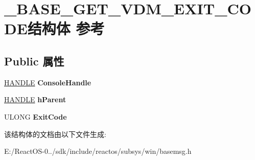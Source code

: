 \hypertarget{struct___b_a_s_e___g_e_t___v_d_m___e_x_i_t___c_o_d_e}{}\section{\+\_\+\+B\+A\+S\+E\+\_\+\+G\+E\+T\+\_\+\+V\+D\+M\+\_\+\+E\+X\+I\+T\+\_\+\+C\+O\+D\+E结构体 参考}
\label{struct___b_a_s_e___g_e_t___v_d_m___e_x_i_t___c_o_d_e}
\subsection*{Public 属性}
\begin{DoxyCompactItemize}
\item 
\mbox{\label{struct___b_a_s_e___g_e_t___v_d_m___e_x_i_t___c_o_d_e_a728269a1b1643a83893f0eb2469a97b8}} 
\hyperlink{interfacevoid}{H\+A\+N\+D\+LE} {\bfseries Console\+Handle}
\item 
\mbox{\label{struct___b_a_s_e___g_e_t___v_d_m___e_x_i_t___c_o_d_e_aaad941e74eb6cbbce6afd8188ebc7b37}} 
\hyperlink{interfacevoid}{H\+A\+N\+D\+LE} {\bfseries h\+Parent}
\item 
\mbox{\label{struct___b_a_s_e___g_e_t___v_d_m___e_x_i_t___c_o_d_e_ab2388656e98514ba7679d52f4e9acb10}} 
U\+L\+O\+NG {\bfseries Exit\+Code}
\end{DoxyCompactItemize}


该结构体的文档由以下文件生成\+:\begin{DoxyCompactItemize}
\item 
E\+:/\+React\+O\+S-\/0../sdk/include/reactos/subsys/win/basemsg.\+h\end{DoxyCompactItemize}
